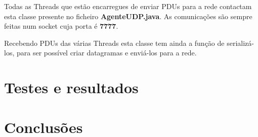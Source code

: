 \documentclass{llncs}
\begin{document}
Todas as Threads que estão encarregues de enviar PDUs para a rede contactam esta classe presente no ficheiro \textbf{AgenteUDP.java}. As comunicações são sempre feitas num socket cuja porta é \textbf{7777}.

Recebendo PDUs das várias Threads esta classe tem ainda a função de serializá-los, para ser possível criar datagramas e enviá-los para a rede.





\section{Testes e resultados}



\section{Conclusões}
\end{document}
